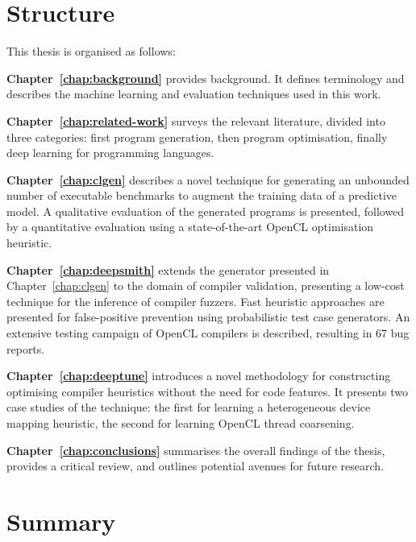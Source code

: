 \newpage
\section{Structure}

This thesis is organised as follows:

\textbf{Chapter~\ref{chap:background}} provides background. It defines terminology and describes the machine learning and evaluation techniques used in this work.

\textbf{Chapter~\ref{chap:related-work}} surveys the relevant literature, divided into three categories: first program generation, then program optimisation, finally deep learning for programming languages.

\textbf{Chapter~\ref{chap:clgen}} describes a novel technique for generating an unbounded number of executable benchmarks to augment the training data of a predictive model. A qualitative evaluation of the generated programs is presented, followed by a quantitative evaluation using a state-of-the-art OpenCL optimisation heuristic.

\textbf{Chapter~\ref{chap:deepsmith}} extends the generator presented in Chapter~\ref{chap:clgen} to the domain of compiler validation, presenting a low-cost technique for the inference of compiler fuzzers. Fast heuristic approaches are presented for false-positive prevention using probabilistic test case generators. An extensive testing campaign of OpenCL compilers is described, resulting in 67 bug reports.

\textbf{Chapter~\ref{chap:deeptune}} introduces a novel methodology for constructing optimising compiler heuristics without the need for code features. It presents two case studies of the technique: the first for learning a heterogeneous device mapping heuristic, the second for learning OpenCL thread coarsening.

\textbf{Chapter~\ref{chap:conclusions}} summarises the overall findings of the thesis, provides a critical review, and outlines potential avenues for future research.


\section{Summary}

